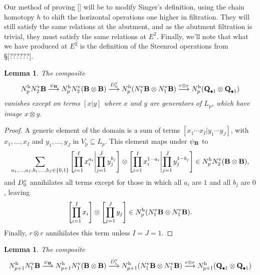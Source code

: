 \documentclass[11pt]{amsart}
\theoremstyle{plain}
\newtheorem{lem}[thm]{Lemma}
\theoremstyle{definition}
\renewcommand{\to}{\longrightarrow}
\theoremstyle{plain}
\begin{document}
\begin{appendices}
Our method of proving [] will be to modify Singer's definition, using the chain homotopy $h$ to shift the horizontal operations one higher in filtration. They will still satisfy the same relations at the abutment, and as the abutment filtration is trivial, they must satisfy the same relations at $E^2$. Finally, we'll note that what we have produced at $E^2$ is the definition of the Steenrod operations from \S[??????].
\begin{lem}\label{firstCompositeLemma}
The composite
\[N_{p}^\textup{h}N_2^\textup{v}\textup{\textbf{B}}\overset{\psi_{\textup{\textbf{B}}}}{\to} N_{p}^\textup{h}N_2^\textup{v}(\textup{\textbf{B}}\otimes\textup{\textbf{B}}) \overset{D_0^\textup{v}}{\to} N_{p}^\textup{h}(N_1^\textup{v}\textup{\textbf{B}}\otimes N_1^\textup{v}\textup{\textbf{B}})\overset{r\otimes r}{\to}N^\textup{h}_p(\textup{\textbf{Q}}_{\bullet 1}\otimes \textup{\textbf{Q}}_{\bullet 1})\]
vanishes except on terms $[x|y]$ where $x$ and $y$ are generators of $ L_p$, which have image $x\otimes y$.
\end{lem}
\begin{proof}
A generic element of the domain is a sum of terms $[x_1\cdots x_I|y_1\cdots y_J]$, with $x_1,\ldots,x_I$ and $y_1,\ldots,y_J$ in $V_p\subseteq L_p$. This element maps under $\psi_{\textup{\textbf{B}}}$ to
\[\sum_{\smash{a_1,\ldots,a_I,b_1,\ldots,b_J\in\{0,1\}}}
\left[\prod_{i=1}^Ix_i^{a_i}\middle|\prod_{\smash{j=1}}^Jy_j^{b_j}\right]\otimes
\left[\prod_{i=1}^Ix_i^{1-a_i}\middle|\prod_{\smash{j=1}}^Jy_j^{1-b_j}\right]
\in N_{p}^\textup{h}N_2^\textup{v}(\textup{\textbf{B}}\otimes\textup{\textbf{B}}),
\]
and $D_0^\textup{v}$ annihilates all terms except for those in which all $a_i$ are $1$ and all $b_j$ are $0$, leaving
\[\left[\prod_{i=1}^Ix_i\right]\otimes
\left[\prod_{\smash{j=1}}^Jy_j\right]\in N_{p}^\textup{h}(N_1^\textup{v}\textup{\textbf{B}}\otimes N_1^\textup{v}\textup{\textbf{B}}).\]
Finally, $r\otimes r$ annihilates this term unless $I=J=1$.
\end{proof}
\begin{lem}\label{secondCompositeLemma}
The composite
\[N_{p+1}^\textup{h} N_1^\textup{v}\textup{\textbf{B}}\overset{\psi_{\textup{\textbf{B}}}}{\to} N_{p+1}^\textup{h}N_1^\textup{v}(\textup{\textbf{B}}\otimes\textup{\textbf{B}}) \overset{D_1^\textup{v}}{\to} N_{p+1}^\textup{h}(N_1^\textup{v}\textup{\textbf{B}}\otimes N_1^\textup{v}\textup{\textbf{B}})\overset{r\otimes r}{\to}N^\textup{h}_{p+1}(\textup{\textbf{Q}}_{\bullet 1}\otimes \textup{\textbf{Q}}_{\bullet 1})\]

\end{lem}
\end{appendices}
\end{document}

